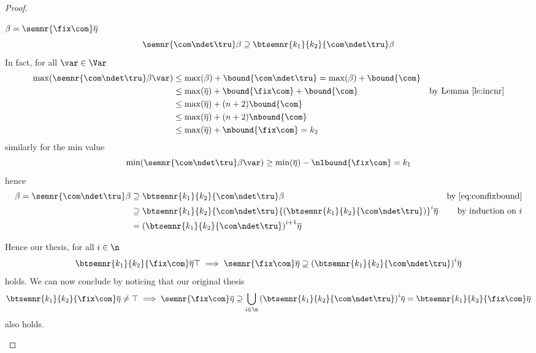 \begin{proof}
\begin{inductive}
\begin{description}
      \(\beta = \semnr{\fix\com}\overline\eta\)
      \begin{equation}\label{eq:comfixbound}
       \semnr{\com\ndet\tru}\beta \supseteq \btsemnr{k_1}{k_2}{\com\ndet\tru}\beta
      \end{equation}
      In fact, for all \(\var\in \Var\)
      \begin{align*}
        \max(\semnr{\com\ndet\tru}\beta\var) & \leq \max(\beta) + \bound{\com\ndet\tru} = \max(\beta) + \bound{\com} \\
                                             & \leq \max(\overline\eta) + \bound{\fix\com} + \bound{\com} & \text{by Lemma~\ref{le:incnr}} \\
                                             & \leq \max(\overline\eta) + (n+2)\bound{\com} \\
                                             & \leq \max(\overline\eta) + (n+2)\nbound{\com} \\
                                             & \leq \max(\overline\eta) + \nbound{\fix\com} = k_2
      \end{align*}
      similarly for the min value
      \begin{equation*}
        \min(\semnr{\com\ndet\tru}\beta\var) \geq \min(\overline\eta) - \nlbound{\fix\com} = k_1
      \end{equation*}
      hence
      \begin{align*}
        \beta = \semnr{\com\ndet\tru}\beta & \supseteq \btsemnr{k_1}{k_2}{\com\ndet\tru}\beta & \text{by~\eqref{eq:comfixbound}}\\
                                           & \supseteq \btsemnr{k_1}{k_2}{\com\ndet\tru}{\left(\btsemnr{k_1}{k_2}{\com\ndet\tru}\right)}^i\overline\eta & \text{by induction on } i\\
                                           & = {\left(\btsemnr{k_1}{k_2}{\com\ndet\tru}\right)}^{i+1}\overline\eta
      \end{align*}
    \end{description}
    Hence our thesis, for all \(i \in \n\)
    \begin{equation*}
      \btsemnr{k_1}{k_2}{\fix\com}\overline\eta \top \implies
      \semnr{\fix\com}\overline\eta \supseteq
      {\left(\btsemnr{k_1}{k_2}{\com\ndet\tru}\right)}^i\overline\eta
    \end{equation*}
    holds.  We can now conclude by noticing that our original thesis
    \begin{equation*}
      \btsemnr{k_1}{k_2}{\fix\com}\overline\eta \neq \top \implies
      \semnr{\fix\com}\overline\eta \supseteq
      \bigcup_{i\in\n}{\left(\btsemnr{k_1}{k_2}{\com\ndet\tru}\right)}^i\overline\eta =
      \btsemnr{k_1}{k_2}{\fix\com}\overline\eta
    \end{equation*}
    also holds.
  \end{inductive}
\end{proof}

